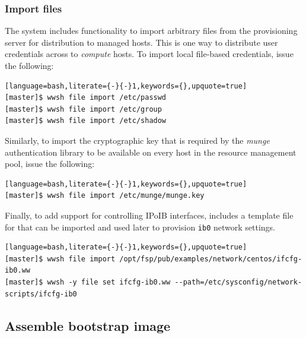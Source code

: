 \documentclass[letterpaper]{article}
\begin{document}
\subsubsection{Import files} \label{sec:file_import}

The \Warewulf{} system includes functionality to import arbitrary files from the
provisioning server for distribution to managed hosts. This is one way
to distribute user credentials across to {\em compute} hosts. To
import local file-based credentials, issue the following:

\begin{lstlisting}[language=bash,literate={-}{-}1,keywords={},upquote=true]
[master]$ wwsh file import /etc/passwd                                                                                                       
[master]$ wwsh file import /etc/group
[master]$ wwsh file import /etc/shadow 
\end{lstlisting}

Similarly, to import the cryptographic key that is required by the {\em munge}
authentication library to be available on every host in the resource management
pool, issue the following:

\begin{lstlisting}[language=bash,literate={-}{-}1,keywords={},upquote=true]
[master]$ wwsh file import /etc/munge/munge.key
\end{lstlisting}

Finally, to add support for controlling IPoIB interfaces, \FSP{} includes a
template file for \Warewulf{} that can be imported and used later to provision
\texttt{ib0} network settings.

\begin{lstlisting}[language=bash,literate={-}{-}1,keywords={},upquote=true]
[master]$ wwsh file import /opt/fsp/pub/examples/network/centos/ifcfg-ib0.ww
[master]$ wwsh -y file set ifcfg-ib0.ww --path=/etc/sysconfig/network-scripts/ifcfg-ib0
\end{lstlisting}


\subsection{Assemble bootstrap image} \label{sec:assemble_bootstrap}
\end{document}
